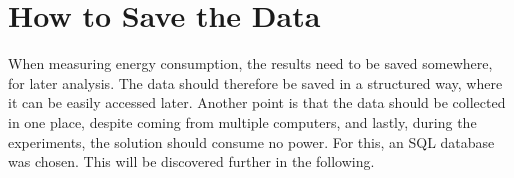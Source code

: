 \section{How to Save the Data}\label{sec:save_data}

When measuring energy consumption, the results need to be saved somewhere, for later analysis. The data should therefore be saved in a structured way, where it can be easily accessed later. Another point is that the data should be collected in one place, despite coming from multiple computers, and lastly, during the experiments, the solution should consume no power. For this, an SQL database was chosen. This will be discovered further in the following.

